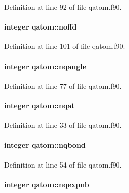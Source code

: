 Definition at line 92 of file qatom.\-f90.

\hypertarget{classqatom_a87bc07bd4a86830062583403e3438dfa}{
\paragraph[{noffd}]{\setlength{\rightskip}{0pt plus 5cm}integer qatom\-::noffd}}\label{classqatom_a87bc07bd4a86830062583403e3438dfa}


Definition at line 101 of file qatom.\-f90.

\hypertarget{classqatom_acb4dee7d6a9679f6b90735784ead412a}{
\paragraph[{nqangle}]{\setlength{\rightskip}{0pt plus 5cm}integer qatom\-::nqangle}}\label{classqatom_acb4dee7d6a9679f6b90735784ead412a}


Definition at line 77 of file qatom.\-f90.

\hypertarget{classqatom_a15d48d2e096025002da510e477603e61}{
\paragraph[{nqat}]{\setlength{\rightskip}{0pt plus 5cm}integer qatom\-::nqat}}\label{classqatom_a15d48d2e096025002da510e477603e61}


Definition at line 33 of file qatom.\-f90.

\hypertarget{classqatom_a25a6842fa30f963e66849606eed652c7}{
\paragraph[{nqbond}]{\setlength{\rightskip}{0pt plus 5cm}integer qatom\-::nqbond}}\label{classqatom_a25a6842fa30f963e66849606eed652c7}


Definition at line 54 of file qatom.\-f90.

\hypertarget{classqatom_aee32251394714177be381e83d6eb066a}{
\paragraph[{nqexpnb}]{\setlength{\rightskip}{0pt plus 5cm}integer qatom\-::nqexpnb}}\label{classqatom_aee32251394714177be381e83d6eb066a}


